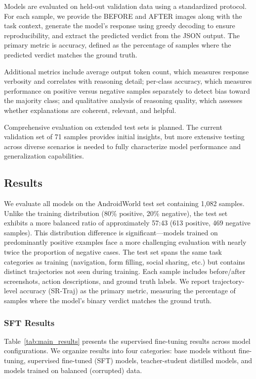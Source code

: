 \documentclass[11pt,a4paper]{article}
\begin{document}
Models are evaluated on held-out validation data using a standardized protocol. For each sample, we provide the BEFORE and AFTER images along with the task context, generate the model's response using greedy decoding to ensure reproducibility, and extract the predicted verdict from the JSON output. The primary metric is accuracy, defined as the percentage of samples where the predicted verdict matches the ground truth.

Additional metrics include average output token count, which measures response verbosity and correlates with reasoning detail; per-class accuracy, which measures performance on positive versus negative samples separately to detect bias toward the majority class; and qualitative analysis of reasoning quality, which assesses whether explanations are coherent, relevant, and helpful.

Comprehensive evaluation on extended test sets is planned. The current validation set of 71 samples provides initial insights, but more extensive testing across diverse scenarios is needed to fully characterize model performance and generalization capabilities.


\subsection{Results}

We evaluate all models on the AndroidWorld test set containing 1,082 samples. Unlike the training distribution (80\% positive, 20\% negative), the test set exhibits a more balanced ratio of approximately 57:43 (613 positive, 469 negative samples). This distribution difference is significant---models trained on predominantly positive examples face a more challenging evaluation with nearly twice the proportion of negative cases. The test set spans the same task categories as training (navigation, form filling, social sharing, etc.) but contains distinct trajectories not seen during training. Each sample includes before/after screenshots, action descriptions, and ground truth labels. We report trajectory-level accuracy (SR-Traj) as the primary metric, measuring the percentage of samples where the model's binary verdict matches the ground truth.

\subsubsection{SFT Results}

Table~\ref{tab:main_results} presents the supervised fine-tuning results across model configurations. We organize results into four categories: base models without fine-tuning, supervised fine-tuned (SFT) models, teacher-student distilled models, and models trained on balanced (corrupted) data.
\end{document}
